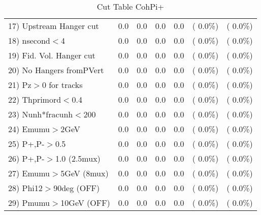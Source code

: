 \begin{table}[h!]
\begin{tabular}{||l||r|r|r|r|r|r||}
 17) Upstream Hanger cut  &          0.0 &          0.0 &          0.0 &          0.0 & (  0.0\%) & (  0.0\%) \\
 18) nsecond$<$4          &          0.0 &          0.0 &          0.0 &          0.0 & (  0.0\%) & (  0.0\%) \\
 19) Fid. Vol. Hanger cut &          0.0 &          0.0 &          0.0 &          0.0 & (  0.0\%) & (  0.0\%) \\
 20) No Hangers fromPVert &          0.0 &          0.0 &          0.0 &          0.0 & (  0.0\%) & (  0.0\%) \\
 21) Pz$>$0 for tracks    &          0.0 &          0.0 &          0.0 &          0.0 & (  0.0\%) & (  0.0\%) \\
 22) Thprimord$<$0.4      &          0.0 &          0.0 &          0.0 &          0.0 & (  0.0\%) & (  0.0\%) \\
 23) Nunh*fracunh$<$200   &          0.0 &          0.0 &          0.0 &          0.0 & (  0.0\%) & (  0.0\%) \\
 24) Emumu$>$2GeV         &          0.0 &          0.0 &          0.0 &          0.0 & (  0.0\%) & (  0.0\%) \\
 25) P+,P-$>$0.5          &          0.0 &          0.0 &          0.0 &          0.0 & (  0.0\%) & (  0.0\%) \\
 26) P+,P-$>$1.0 (2.5mux) &          0.0 &          0.0 &          0.0 &          0.0 & (  0.0\%) & (  0.0\%) \\
 27) Emumu$>$5GeV  (8mux) &          0.0 &          0.0 &          0.0 &          0.0 & (  0.0\%) & (  0.0\%) \\
 28) Phi12$>$90deg  (OFF) &          0.0 &          0.0 &          0.0 &          0.0 & (  0.0\%) & (  0.0\%) \\
 29) Pmumu$>$10GeV  (OFF) &          0.0 &          0.0 &          0.0 &          0.0 & (  0.0\%) & (  0.0\%) \\
 \hline
 \hline
 \end{tabular}
 \caption{Cut Table  CohPi+   }
 \label{tab-cutcohjpsi-mumu_nuecc}
 \end{table}
